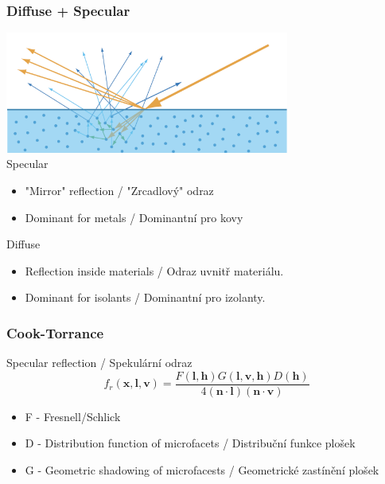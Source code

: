 \begin{frame}\frametitle{Diffuse + Specular}
    \includegraphics[width=0.7\textwidth]{pics/physicallyBasedRendering/ds} \\
    Specular
    \begin{itemize}
        \item "Mirror" reflection / "Zrcadlový" odraz
        \item Dominant for metals / Dominantní pro kovy
    \end{itemize}
    Diffuse
    \begin{itemize}
        \item Reflection inside materials / Odraz uvnitř materiálu.
        \item Dominant for isolants / Dominantní pro izolanty.
    \end{itemize}
\end{frame}

\begin{frame}
    \frametitle{Cook-Torrance}
    Specular reflection / Spekulární odraz
    \begin{equation*}
        f_r(\mathbf x, \mathbf l, \mathbf v) = \frac{F(\mathbf l, \mathbf h)G(\mathbf l, \mathbf v, \mathbf h)D(\mathbf h)}{4(\mathbf n \cdot \mathbf l)(\mathbf n \cdot \mathbf v)}
    \end{equation*}
    \begin{itemize}
        \item F - Fresnell/Schlick
        \item D - Distribution function of microfacets / Distribuční funkce plošek
        \item G - Geometric shadowing of microfacests / Geometrické zastínění plošek
    \end{itemize}
\end{frame}

